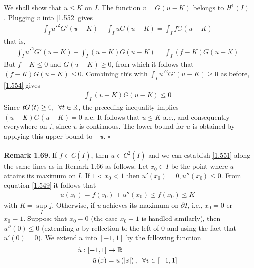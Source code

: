 \documentclass[a4paper,oneside]{article}
\numberwithin{equation}{section}
\begin{document}
We shall show that $u\le K$ on $I$. The function $v=G\left(u-K\right)$ belongs to $H^1\left(I\right)$. Plugging $v$ into \eqref{1.552} gives
\begin{align}
\int_I {u{'^2}G'\left( {u - K} \right)}  + \int_I {uG\left( {u - K} \right)}  = \int_I {fG\left( {u - K} \right)} 
\end{align}
that is,
\begin{align}
\label{1.554}
\int_I {u{'^2}G'\left( {u - K} \right)}  + \int_I {\left( {u - K} \right)G\left( {u - K} \right)}  = \int_I {\left( {f - K} \right)G\left( {u - K} \right)} 
\end{align}
But $f-K\le 0$ and $G\left(u-K\right)\ge 0$, from which it follows that ${\left( {f - K} \right)G\left( {u - K} \right)}\le 0$. Combining this with $\int_I {u{'^2}G'\left( {u - K} \right)}  \ge 0$ as before, \eqref{1.554} gives
\begin{align}
\int_I {\left( {u - K} \right)G\left( {u - K} \right)} \le 0
\end{align}
Since $tG\left(t\right)\ge 0,\hspace{0.2cm}\forall t\in \mathbb{R}$, the preceding inequality implies $\left( {u - K} \right)G\left( {u - K} \right) = 0$ a.e. It follows that $u\le K$ a.e., and consequently everywhere on $I$, since $u$ is continuous. The lower bound for $u$ is obtained by applying this upper bound to $-u$. \hfill $\square$\\
\\
\textbf{Remark 1.69.} If $f\in C\left(\bar I\right)$, then $u\in C^2\left(\bar I\right)$ and we can establish \eqref{1.551} along the same lines as in Remark 1.66 as follows. Let $x_0\in \bar I$ be the point where $u$ attains its maximum on $\bar I$. If  $1<x_0<1$ then $u'\left(x_0\right)=0,u''\left(x_0\right)\le 0$. From equation \eqref{1.549} it follows that
\begin{align}
u\left( {{x_0}} \right) = f\left( {{x_0}} \right) + u''\left( {{x_0}} \right) \le f\left( {{x_0}} \right) \le K
\end{align}
with $K = \mathop {\sup }\limits_I f$. Otherwise, if $u$ achieves its maximum on $\partial I$, i.e., $x_0=0$ or $x_0=1$. Suppose that $x_0=0$ (the case $x_0=1$ is handled similarly), then $u''\left(0\right)\le 0$ (extending $u$ by reflection to the left of 0 and using the fact that $u'\left(0\right)=0$). We extend $u$ into $\left[-1,1\right]$ by the following function
\begin{align}
\tilde u:\left[ { - 1,1} \right] &\to \mathbb{R}\\
\tilde u\left( x \right) &= u\left( {\left| x \right|} \right),\hspace{0.2cm}\forall v \in \left[ { - 1,1} \right]
\end{align}
\end{document}
